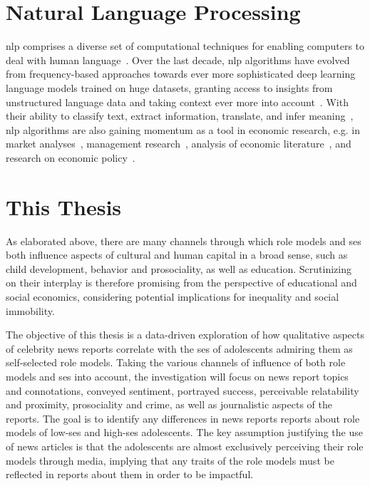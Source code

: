 \section{Natural Language Processing}\label{ch:nlp}
\gls{nlp} comprises a diverse set of computational techniques for enabling computers to deal with human language~\autocite{jurafsky_speech_2008}. Over the last decade, \gls{nlp} algorithms have evolved from frequency-based approaches towards ever more sophisticated deep learning language models trained on huge datasets, granting access to insights from unstructured language data and taking context ever more into account~\autocite{vajjala_practical_2020}. With their ability to classify text, extract information, translate, and infer meaning~\autocite{jurafsky_speech_2008}, \gls{nlp} algorithms are also gaining momentum as a tool in economic research, e.g. in market analyses~\autocite{hoberg_product_2010}, management research~\autocite{kang_natural_2020}, analysis of economic literature~\autocite{kim_keyword_2021,jelveh_detecting_2014,lambert_identifying_2021}, and research on economic policy~\autocite{elshehawy_sascat_2022}.


\section{This Thesis}\label{ch:this_thesis}
As elaborated above, there are many channels through which role models and \gls{ses} both influence aspects of cultural and human capital in a broad sense, such as child development, behavior and prosociality, as well as education. Scrutinizing on their interplay is therefore promising from the perspective of educational and social economics, considering potential implications for inequality and social immobility.

The objective of this thesis is a data-driven exploration of how qualitative aspects of celebrity news reports correlate with the \gls{ses} of adolescents admiring them as self-selected role models. Taking the various channels of influence of both role models and \gls{ses} into account, the investigation will focus on news report topics and connotations, conveyed sentiment, portrayed success, perceivable relatability and proximity, prosociality and crime, as well as journalistic aspects of the reports. The goal is to identify any differences in news reports reports about role models of low-\gls{ses} and high-\gls{ses} adolescents. The key assumption justifying the use of news articles is that the adolescents are almost exclusively perceiving their role models through media, implying that any traits of the role models must be reflected in reports about them in order to be impactful.

